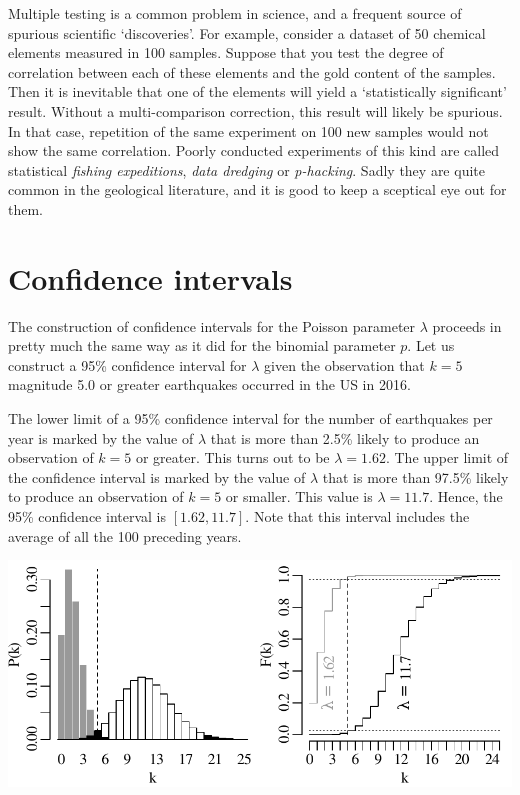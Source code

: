 Multiple testing is a common problem in science, and a frequent source
of spurious scientific `discoveries'. For example, consider a dataset
of 50 chemical elements measured in 100 samples. Suppose that you test
the degree of correlation between each of these elements and the gold
content of the samples. Then it is inevitable that one of the elements
will yield a `statistically significant' result. Without a
multi-comparison correction, this result will likely be spurious. In
that case, repetition of the same experiment on 100 new samples would
not show the same correlation. Poorly conducted experiments of this
kind are called statistical \emph{fishing expeditions}, \emph{data
  dredging} or \emph{p-hacking}. Sadly they are quite common in the
geological literature, and it is good to keep a sceptical eye out for
them.

\section{Confidence intervals}
\label{sec:poisCI}

The construction of confidence intervals for the Poisson parameter
$\lambda$ proceeds in pretty much the same way as it did for the
binomial parameter $p$. Let us construct a 95\% confidence interval
for $\lambda$ given the observation that $k=5$ magnitude 5.0 or
greater earthquakes occurred in the US in 2016.\medskip

The lower limit of a 95\% confidence interval for the number of
earthquakes per year is marked by the value of $\lambda$ that is more
than 2.5\% likely to produce an observation of $k=5$ or greater. This
turns out to be $\lambda=1.62$. The upper limit of the confidence
interval is marked by the value of $\lambda$ that is more than 97.5\%
likely to produce an observation of $k=5$ or smaller. This value is
$\lambda=11.7$. Hence, the 95\% confidence interval is $[1.62, 11.7]$.
Note that this interval includes the average of all the 100 preceding
years. \medskip

\noindent\begin{minipage}[t][][b]{.6\textwidth}
  \includegraphics[]{../figures/poisci.pdf}\medskip
\end{minipage}
\begin{minipage}[t][][t]{.4\textwidth}
  \label{fig:poisci}
\end{minipage}


